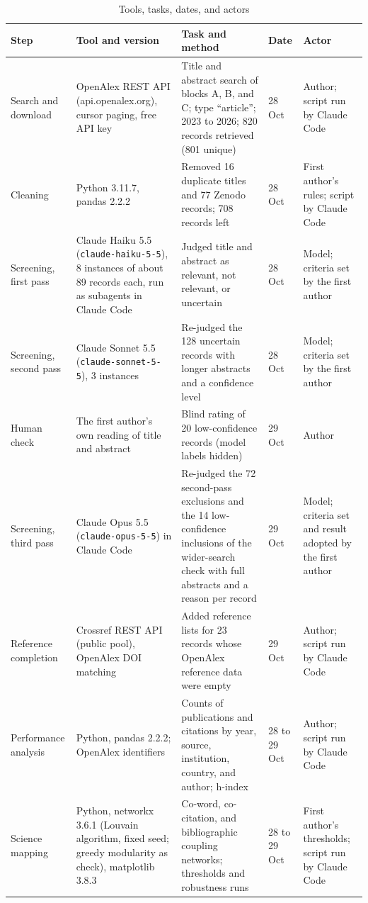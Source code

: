 \begin{table}[htbp]
\centering
\footnotesize
\caption{Tools, tasks, dates, and actors}
\label{tab:tools}
\begin{tabularx}{\textwidth}{p{}YYp{0.08\textwidth}p{0.14\textwidth}}
\hline
\textbf{Step} & \textbf{Tool and version} & \textbf{Task and method} & \textbf{Date} & \textbf{Actor} \\ \hline
Search and download & OpenAlex REST API (api.openalex.org), cursor paging, free API key & Title and abstract search of blocks A, B, and C; type ``article''; 2023 to 2026; 820 records retrieved (801 unique) & 28 Oct & Author; script run by Claude Code \\
Cleaning & Python 3.11.7, pandas 2.2.2 & Removed 16 duplicate titles and 77 Zenodo records; 708 records left & 28 Oct & First author's rules; script by Claude Code \\
Screening, first pass & Claude Haiku 5.5 (\texttt{claude-haiku-5-5}), 8 instances of about 89 records each, run as subagents in Claude Code & Judged title and abstract as relevant, not relevant, or uncertain & 28 Oct & Model; criteria set by the first author \\
Screening, second pass & Claude Sonnet 5.5 (\texttt{claude-sonnet-5-5}), 3 instances & Re-judged the 128 uncertain records with longer abstracts and a confidence level & 28 Oct & Model; criteria set by the first author \\
Human check & The first author's own reading of title and abstract & Blind rating of 20 low-confidence records (model labels hidden) & 29 Oct & Author \\
Screening, third pass & Claude Opus 5.5 (\texttt{claude-opus-5-5}) in Claude Code & Re-judged the 72 second-pass exclusions and the 14 low-confidence inclusions of the wider-search check with full abstracts and a reason per record & 29 Oct & Model; criteria set and result adopted by the first author \\
Reference completion & Crossref REST API (public pool), OpenAlex DOI matching & Added reference lists for 23 records whose OpenAlex reference data were empty & 29 Oct & Author; script run by Claude Code \\
Performance analysis & Python, pandas 2.2.2; OpenAlex identifiers & Counts of publications and citations by year, source, institution, country, and author; h-index & 28 to 29 Oct & Author; script run by Claude Code \\
Science mapping & Python, networkx 3.6.1 (Louvain algorithm, fixed seed; greedy modularity as check), matplotlib 3.8.3 & Co-word, co-citation, and bibliographic coupling networks; thresholds and robustness runs & 28 to 29 Oct & First author's thresholds; script run by Claude Code \\

\end{tabularx}
\end{table}

